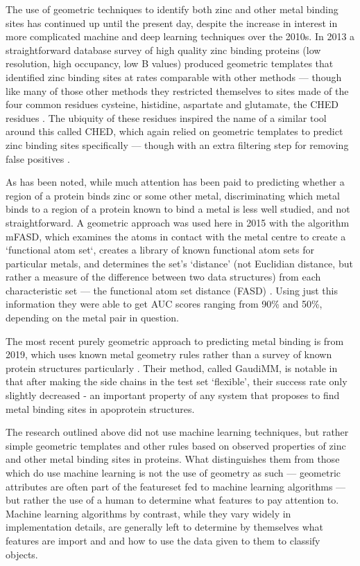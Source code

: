 The use of geometric techniques to identify both zinc and other metal binding sites has continued up until the present day, despite the increase in interest in more complicated machine and deep learning techniques over the 2010s. In 2013 a straightforward database survey of high quality zinc binding proteins (low resolution, high occupancy, low B values) produced geometric templates that identified zinc binding sites at rates comparable with other methods --- though like many of those other methods they restricted themselves to sites made of the four common residues cysteine, histidine, aspartate and glutamate, the CHED residues \cite{liu2014}. The ubiquity of these residues inspired the name of a similar tool around this called CHED, which again relied on geometric templates to predict zinc binding sites specifically --- though with an extra filtering step for removing false positives \cite{sobolev2013web}.

As has been noted, while much attention has been paid to predicting whether a region of a protein binds zinc or some other metal, discriminating which metal binds to a region of a protein known to bind a metal is less well studied, and not straightforward. A geometric approach was used here in 2015 with the algorithm mFASD, which examines the atoms in contact with the metal centre to create a `functional atom set`, creates a library of known functional atom sets for particular metals, and determines the set's `distance' (not Euclidian distance, but rather a measure of the difference between two data structures) from each characteristic set --- the functional atom set distance (FASD) \cite{he2015}. Using just this information they were able to get AUC scores ranging from 90\% and 50\%, depending on the metal pair in question. 

The most recent purely geometric approach to predicting metal binding is from 2019, which uses known metal geometry rules rather than a survey of known protein structures particularly \cite{sciortino2019}. Their method, called GaudiMM, is notable in that after making the side chains in the test set `flexible', their success rate only slightly decreased - an important property of any system that proposes to find metal binding sites in apoprotein structures.

The research outlined above did not use machine learning techniques, but rather simple geometric templates and other rules based on observed properties of zinc and other metal binding sites in proteins. What distinguishes them from those which do use machine learning is not the use of geometry as such --- geometric attributes are often part of the featureset fed to machine learning algorithms --- but rather the use of a human to determine what features to pay attention to. Machine learning algorithms by contrast, while they vary widely in implementation details, are generally left to determine by themselves what features are import and and how to use the data given to them to classify objects.


